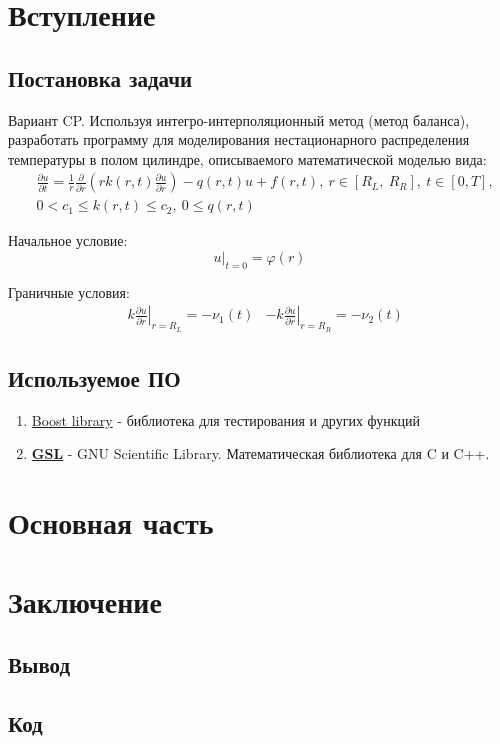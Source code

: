 \documentclass[a4paper,12pt]{article}
\begin{document}
	
	\newpage
	\tableofcontents
	\newpage

	\section{Вступление}
	\subsection{Постановка задачи}

	Вариант CP. Используя интегро-интерполяционный метод (метод баланса), разработать программу для моделирования нестационарного распределения температуры в полом цилиндре, описываемого математической моделью вида:
	\begin{align*}
		&\frac{\partial u}{\partial t} = \frac{1}{r} \frac{\partial}{\partial r}
		\left ( rk(r, t)\frac{\partial u}{\partial r} \right ) - q(r, t)u + f(r,t),
		\ r \in \left[ R_L,\ R_R\right],\ t \in [0, T],
		\\
		&0 < c_1 \leq k(r, t) \leq c_2,\ 0 \leq q(r, t)
	\end{align*}

	Начальное условие:
	\[
		\left. u \right\vert_{t=0} = \varphi(r)
	\]

	Граничные условия: \newline
	\begin{align*}
		&k \left. \frac{\partial u}{\partial r}\right\vert_{r = R_L} = -\nu_1(t)
		&-k \left. \frac{\partial u}{\partial r}\right\vert_{r = R_R} = -\nu_2(t)
	\end{align*}
	\subsection{Используемое ПО}

	\begin{enumerate}
		\item \href{https://www.boost.org/}{Boost library} - библиотека для тестирования и других функций
		\item \href{https://www.gnu.org/software/gsl/}{\textbf{GSL}} - GNU Scientific Library. Математическая библиотека для C и C++.
	\end{enumerate}
	\newpage

	\section{Основная часть}
	
	\newpage

	\section{Заключение}
	\subsection{Вывод}
	\newpage
	\subsection{Код}
\end{document}
